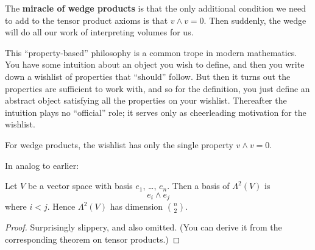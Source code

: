 The \textbf{miracle of wedge products} is that the only additional condition
we need to add to the tensor product axioms is that $v \wedge v = 0$.
Then suddenly, the wedge will do all our work of interpreting volumes for us.

\begin{remark*}
	This ``property-based'' philosophy is a common trope in modern mathematics.
	You have some intuition about an object you wish to define,
	and then you write down a wishlist of properties that ``should'' follow.
	But then it turns out the properties are sufficient to work with,
	and so for the definition, you just define an abstract object
	satisfying all the properties on your wishlist.
	Thereafter the intuition plays no ``official'' role;
	it serves only as cheerleading motivation for the wishlist.

	For wedge products,
	the wishlist has only the single property $v \wedge v = 0$.
\end{remark*}

In analog to earlier:
\begin{proposition}
	Let $V$ be a vector space
	with basis $e_1$, \dots, $e_n$.
	Then a basis of $\Lambda^2(V)$ is
	\[ e_i \wedge e_j \]
	where $i < j$.
	Hence $\Lambda^2(V)$ has dimension $\binom n2$.
\end{proposition}
\begin{proof}
	Surprisingly slippery, and also omitted.
	(You can derive it from the corresponding theorem on tensor products.)
\end{proof}

